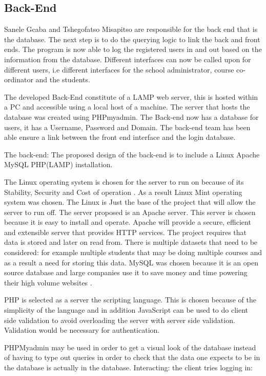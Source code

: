 \documentclass[10pt,onecolumn]{RequimentsGathering}
\begin{document}
\subsection{Back-End}

Sanele Gcaba and Tshegofatso Misapitso are responsible for the back end that is the database. The next step is to do the querying logic to link the back and front ends. The program is now able to log the registered users in and out based on the information from the database. Different interfaces can now be called upon for different users, i.e different interfaces for the school administrator, course co-ordinator and the students.


The developed Back-End constitute of a LAMP web server, this is hosted within a PC and accessible using a local host of a machine. The server that hosts the database was created using PHPmyadmin. The Back-end now has a database for users, it has a Username, Password and Domain. The back-end team has been able ensure a link between the front end interface and the login database. 


The back-end:
The proposed design of the back-end is to include a Linux Apache MySQL PHP(LAMP) installation.

The Linux operating system is chosen for the server to run on because of its Stability, Security and Cost of operation \cite{ref1}.   
As a result Linux Mint operating system was chosen.
The Linux is Just the base of the project that will allow the server to run off. The server proposed is an Apache server. This server is chosen because it is easy to install and operate. Apache will provide a secure, efficient and extensible server that provides HTTP services.
The project requires that data is stored and later on read from. There is multiple datasets that need to be considered: for example multiple students that may be doing multiple courses and as a result a need for storing this data. MySQL was chosen because it is an open source database and large companies use it to save money and time powering their high volume websites \cite{ref2}.

PHP is  selected as a server the scripting language. This is chosen because of the simplicity of the language and in addition JavaScript can be used to do client side validation to avoid overloading the server with server side validation. Validation would be necessary for authentication. 

PHPMyadmin may be used in order to get a visual look of the database instead of having to type out queries in order to check that the data one expects to be in the database is actually in the database. 
Interacting: the client tries logging in:
\end{document}
